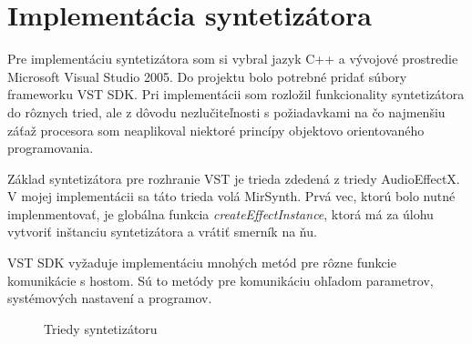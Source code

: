 \chapter{Implementácia syntetizátora}

Pre implementáciu syntetizátora som si vybral jazyk C++ a vývojové prostredie Microsoft Visual Studio 2005. Do projektu bolo potrebné pridať súbory frameworku VST SDK. Pri implementácii som rozložil funkcionality syntetizátora do rôznych tried, ale z dôvodu nezlučiteľnosti s požiadavkami na čo najmenšiu záťaž procesora som neaplikoval niektoré princípy objektovo orientovaného programovania.

Základ syntetizátora pre rozhranie VST je trieda zdedená z triedy AudioEffectX. V mojej implementácii sa táto trieda volá MirSynth. Prvá vec, ktorú bolo nutné implenmentovať, je globálna funkcia \emph{createEffectInstance}, ktorá má za úlohu vytvoriť inštanciu syntetizátora a vrátiť smerník na ňu.

VST SDK vyžaduje implementáciu mnohých metód pre rôzne funkcie komunikácie s hostom. Sú to metódy pre komunikáciu ohľadom parametrov, systémových nastavení a programov.



\begin{figure}[h]
\centering
{}
\caption{\label{obr11} Triedy syntetizátoru}
\end{figure}

